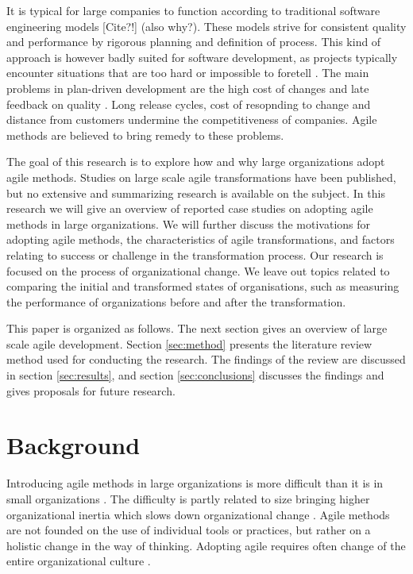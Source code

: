 \documentclass[lnbip]{svmultln}
\begin{document}
It is typical for large companies to function according to traditional software
engineering models [Cite?!] (also why?). These models strive for consistent quality and performance
by rigorous planning and definition of process. This kind of approach is however
badly suited for software development, as projects typically encounter
situations that are too hard or impossible to foretell \cite{Schwaber2002}.
The main problems in plan-driven development are the high cost of changes and
late feedback on quality \cite{Petersen2010}. Long release cycles, cost of
resopnding to change and distance from customers undermine the  competitiveness
of companies. Agile methods are believed to bring remedy to these problems.

The goal of this research is to explore how and why large organizations adopt
agile methods. Studies on large scale agile transformations have been published,
but no extensive and summarizing research is available on the subject. In this
research we will give an overview of reported case studies on adopting agile
methods in large organizations. We will further discuss the motivations for
adopting agile methods, the characteristics of agile transformations, and
factors relating to success or challenge in the transformation process. Our
research is focused on the process of organizational change. We leave out topics
related to comparing the initial and transformed states of organisations, such
as measuring the performance of organizations before and after the
transformation.

This paper is organized as follows. The next section gives an overview of large
scale agile development. Section \ref{sec:method} presents the literature review
method used for conducting the research. The findings of the review are
discussed in section \ref{sec:results}, and section \ref{sec:conclusions}
discusses the findings and gives proposals for future research.


\section{Background}
\label{sec:background}

Introducing agile methods in large organizations is more difficult than it is in
small organizations \cite{Dyba2008}. The difficulty is partly related to size
bringing higher organizational inertia which slows down organizational change
\cite{Livermore2008}. Agile methods are not founded on the use of individual
tools or practices, but rather on a holistic change in the way of thinking.
Adopting agile requires often change of the entire organizational culture
\cite{Misra2010}.
\end{document}
